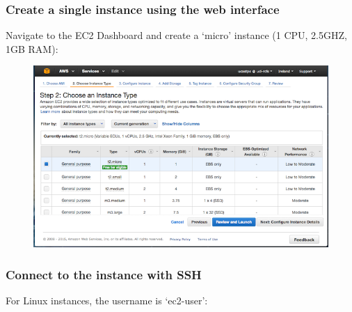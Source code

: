 \subsubsection{Create a single instance using the web
interface}\label{create-a-single-instance-using-the-web-interface}

Navigate to the EC2 Dashboard and create a `micro' instance (1 CPU,
2.5GHZ, 1GB RAM):

\begin{figure}[htbp]
\centering
\includegraphics{97Cloud/figures/create_ec2_instance.png}
\end{figure}

\subsubsection{Connect to the instance with
SSH}\label{connect-to-the-instance-with-ssh}

For Linux instances, the username is `ec2-user':

\begin{Shaded}
\begin{Highlighting}[]
\NormalTok{$ } \KeywordTok{<}\KeywordTok{>} \KeywordTok{<}\KeywordTok{>}
\end{Highlighting}
\end{Shaded}


